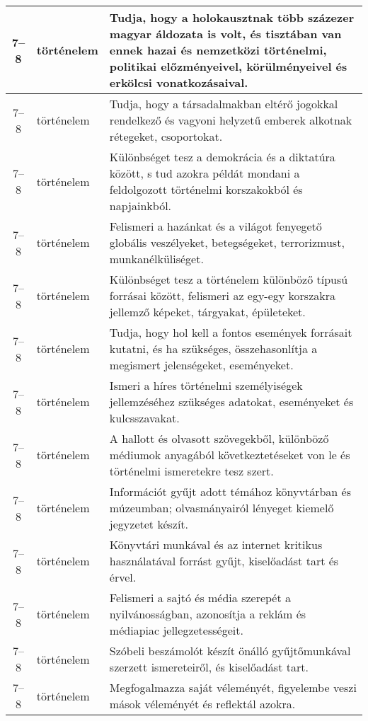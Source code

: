 \begin{small}
\begin{longtable}{c | p{2cm} |  p{11cm} }
              7--8 & történelem & Tudja, hogy a holokausztnak több százezer magyar áldozata is volt, és  tisztában van ennek hazai és nemzetközi történelmi, politikai előzményeivel, körülményeivel és erkölcsi vonatkozásaival. \\ \hline
              7--8 & történelem & Tudja, hogy a társadalmakban eltérő jogokkal rendelkező és vagyoni helyzetű emberek alkotnak rétegeket, csoportokat. \\ \hline
              7--8 & történelem & Különbséget tesz a demokrácia és a diktatúra között, s tud azokra példát mondani a feldolgozott történelmi korszakokból és napjainkból. \\ \hline
              7--8 & történelem & Felismeri a hazánkat és a világot fenyegető globális veszélyeket, betegségeket, terrorizmust, munkanélküliséget. \\ \hline
              7--8 & történelem & Különbséget tesz a történelem különböző típusú forrásai között, felismeri az egy-egy korszakra jellemző képeket, tárgyakat, épületeket. \\ \hline
              7--8 & történelem & Tudja, hogy hol kell a fontos események forrásait kutatni, és ha szükséges, összehasonlítja a megismert jelenségeket, eseményeket. \\ \hline
              7--8 & történelem & Ismeri a híres történelmi személyiségek jellemzéséhez szükséges adatokat, eseményeket és kulcsszavakat. \\ \hline
              7--8 & történelem & A hallott és olvasott szövegekből, különböző médiumok anyagából következtetéseket von le és történelmi ismeretekre tesz szert. \\ \hline
              7--8 & történelem & Információt gyűjt adott témához könyvtárban és múzeumban; olvasmányairól lényeget kiemelő jegyzetet készít. \\ \hline
              7--8 & történelem & Könyvtári munkával és az internet kritikus használatával forrást gyűjt, kiselőadást tart és érvel. \\ \hline
              7--8 & történelem & Felismeri a sajtó és média szerepét a nyilvánosságban, azonosítja a reklám és médiapiac jellegzetességeit. \\ \hline
              7--8 & történelem & Szóbeli beszámolót készít önálló gyűjtőmunkával szerzett ismereteiről, és kiselőadást tart. \\ \hline
              7--8 & történelem & Megfogalmazza saját véleményét, figyelembe veszi mások véleményét és reflektál azokra. \\ \hline

\end{longtable}
\end{small}
